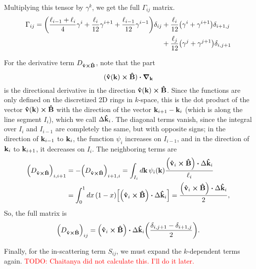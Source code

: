 \documentclass[12pt]{article}
\begin{document}
Multiplying this tensor by $\gamma^k$, we get the full $\Gamma_{ij}$ matrix.
\begin{equation}
\begin{aligned}
    \Gamma_{ij} = \qty(\frac{\ell_{i-1} + \ell_i}{4}\gamma^i + \frac{\ell_i}{12}\gamma^{i+1}
        + \frac{\ell_{i-1}}{12}\gamma^{i-1})\delta_{ij}
    &+ \frac{\ell_i}{12}\qty(\gamma^i + \gamma^{i+1})\delta_{i+1,j} \\
    &+ \frac{\ell_j}{12}\qty(\gamma^j + \gamma^{j+1})\delta_{i,j+1}
\end{aligned}
\end{equation}

For the derivative term $D_{\vu{v}\cross\vu{B}}$, note that the part
\begin{equation}
    (\vu{v}(\vb{k})\cross\vu{B})\vdot\grad_{\vb{k}}
\end{equation}
is the directional derivative in the direction $\vu{v}(\vb{k})\cross\vu{B}$. Since the functions are
only defined on the discretized 2D rings in $k$-space, this is the dot product of the vector
$\vu{v}(\vb{k})\cross\vu{B}$ with the direction of the vector $\vb{k}_{i+1} - \vb{k}_i$ (which is
along the line segment $I_i$), which we call $\Delta\vu{k}_i$. The diagonal terms vanish, since the
integral over $I_i$ and $I_{i-1}$ are completely the same, but with opposite signs; in the
direction of $\vb{k}_{i-1}$ to $\vb{k}_i$, the function $\psi_i$ increases on $I_{i-1}$, and in the
direction of $\vb{k}_i$ to $\vb{k}_{i+1}$, it decreases on $I_i$. The neighboring terms are
\begin{equation}
\begin{aligned}
    \qty(D_{\vu{v}\cross\vu{B}})_{i,i+1} &= -\qty(D_{\vu{v}\cross\vu{B}})_{i+1,i}
        = \int_{I_i} \dd{\vb{k}} \psi_i(\vb{k})
        \frac{\qty(\vu{v}_i\cross\vu{B})\vdot\Delta\vu{k}_i}{\ell_i} \\
    &= \int_0^1 \dd{x} (1-x) \qty[\qty(\vu{v}_i\cross\vu{B})\vdot\Delta\vu{k}_i]
    = \frac{\qty(\vu{v}_i\cross\vu{B})\vdot\Delta\vu{k}_i}{2},
\end{aligned}
\end{equation}
So, the full matrix is
\begin{equation}
    \qty(D_{\vu{v}\cross\vu{B}})_{ij} = \qty(\vu{v}_i\cross\vu{B})\vdot\Delta\vu{k}_i
    \qty(\frac{\delta_{i,j+1} - \delta_{i+1,j}}{2}).
\end{equation}

Finally, for the in-scattering term $S_{ij}$, we must expand the $k$-dependent terms again.
\textcolor{red}{TODO: Chaitanya did not calculate this. I'll do it later.}
\end{document}
